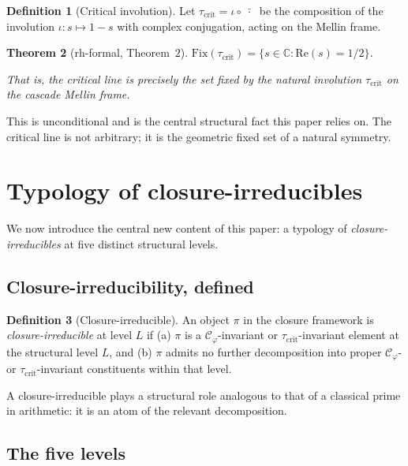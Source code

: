 \documentclass[11pt,a4paper]{article}
\newtheorem{theorem}{Theorem}
\theoremstyle{definition}
\newtheorem{definition}[theorem]{Definition}
\theoremstyle{remark}
\begin{document}
\begin{definition}[Critical involution]
Let $\tau_{\mathrm{crit}} = \iota \circ \bar{\;\cdot\;}$ be the
composition of the involution $\iota: s \mapsto 1 - s$ with complex
conjugation, acting on the Mellin frame.
\end{definition}

\begin{theorem}[rh-formal, Theorem~$2$]\label{thm:fix_tau}
$\mathrm{Fix}(\tau_{\mathrm{crit}}) = \{s \in \mathbb{C} : \mathrm{Re}(s) = 1/2\}$.

\noindent
That is, the critical line is precisely the set fixed by the natural
involution $\tau_{\mathrm{crit}}$ on the cascade Mellin frame.
\end{theorem}

This is unconditional and is the central structural fact this paper
relies on. The critical line is not arbitrary; it is the geometric
fixed set of a natural symmetry.

\section{Typology of closure-irreducibles}\label{sec:typology}

We now introduce the central new content of this paper: a typology of
\emph{closure-irreducibles} at five distinct structural levels.

\subsection{Closure-irreducibility, defined}\label{ssec:irreducible}

\begin{definition}[Closure-irreducible]
An object $\pi$ in the closure framework is \emph{closure-irreducible}
at level $L$ if (a) $\pi$ is a $\mathcal{C}_\varphi$-invariant or
$\tau_{\mathrm{crit}}$-invariant element at the structural level $L$, and
(b) $\pi$ admits no further decomposition into proper
$\mathcal{C}_\varphi$- or $\tau_{\mathrm{crit}}$-invariant constituents
within that level.
\end{definition}

A closure-irreducible plays a structural role analogous to that of
a classical prime in arithmetic: it is an atom of the relevant
decomposition.

\subsection{The five levels}\label{ssec:five_levels}
\end{document}
